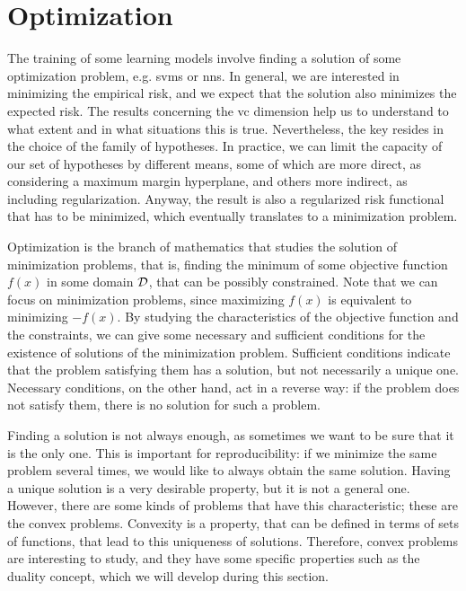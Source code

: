 \section{Optimization}\label{sec:ch2_opt}
%
The training of some learning models involve finding a solution of some optimization problem, e.g. \acrshort{svms} or \acrshort{nns}.
%
In general, we are interested in minimizing the empirical risk, and we expect that the solution also minimizes the expected risk. The results concerning the \acrshort{vc} dimension help us to understand to what extent and in what situations this is true. Nevertheless, the key resides in the choice of the family of hypotheses.
%
In practice, we can limit the capacity of our set of hypotheses by different means, some of which are more direct, as considering a maximum margin hyperplane, and others more indirect, as including regularization. Anyway, the result is also a regularized risk functional that has to be minimized, which eventually translates to a minimization problem.

%
Optimization is the branch of mathematics that studies the solution of minimization problems, that is, finding the minimum of some objective function $f(x)$ in some domain $\mathcal{D}$, that can be possibly constrained. Note that we can focus on minimization problems, since maximizing $f(x)$ is equivalent to minimizing $-f(x)$.
%
By studying the characteristics of the objective function and the constraints, we can give some necessary and sufficient conditions for the existence of solutions of the minimization problem. Sufficient conditions indicate that the problem satisfying them has a solution, but not necessarily a unique one. Necessary conditions, on the other hand, act in a reverse way: if the problem does not satisfy them, there is no solution for such a problem.
%

Finding a solution is not always enough, as sometimes we want to be sure that it is the only one. This is important for reproducibility: if we minimize the same problem several times, we would like to always obtain the same solution.
%
Having a unique solution is a very desirable property, but it is not a general one. However, there are some kinds of problems that have this characteristic; these are the convex problems. Convexity is a property, that can be defined in terms of sets of functions, that lead to this uniqueness of solutions.
%
Therefore, convex problems are interesting to study, and they have some specific properties such as the duality concept, which we will develop during this section.

